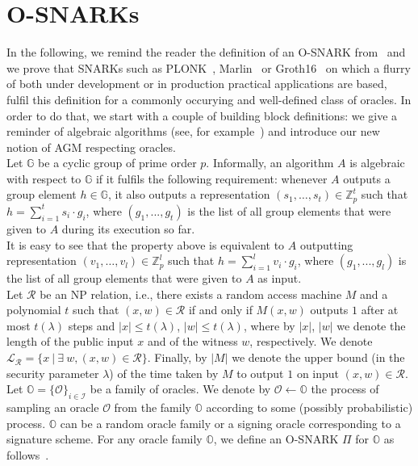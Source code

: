 \section{O-SNARKs}
\label{sec:short_snarks_defs}
In the following, we remind the reader the definition of an O-SNARK from~\cite{O_SNARK} and we prove that 
SNARKs such as PLONK~\cite{plonk}, Marlin~\cite{marlin} or Groth16~\cite{groth16} on which a flurry of 
both under development or in production practical applications are based, fulfil this definition for a commonly occurying 
and well-defined class of oracles. In order to do that, we start with a couple of building block definitions: we give a 
reminder of algebraic algorithms (see, for example~\cite{AGM_model}) and introduce our new notion of AGM respecting oracles. \\

\noindent Let $\mathbb{G}$ be a cyclic group of prime order $p$. Informally, an algorithm $A$ is algebraic with respect to 
$\mathbb{G}$ if it fulfils the following requirement: whenever $A$ outputs a group element $h \in \mathbb{G}$, 
it also outputs a representation $(s_1, \ldots, s_t) \in \mathbb{Z}^{t}_p$ 
such that $h = \sum_ {i =1}^t s_i \cdot g_i$, where $(g_1,...,g_t)$ is the list of all group elements that were given to $A$ during its execution so far. \\

\noindent It is easy to see that the property above is equivalent to $A$ outputting  representation $(v_1, \ldots, v_l) \in \mathbb{Z}^{l}_p$ 
such that $h = \sum_ {i =1}^l v_i \cdot g_i$, where $(g_1,...,g_l)$ is the list of all group elements that were given to $A$ as input. \\

\noindent Let $\mathcal{R}$ be an NP relation, i.e., there exists a random access machine $M$ and a polynomial $t$ 
such that  $(x,w) \in \mathcal{R}$ if and only if $M(x,w)$ outputs $1$ after at most $t(\lambda)$ steps and 
$|x| \leq t(\lambda)$, $|w| \leq t(\lambda)$, where by $|x|$, $|w|$ we denote the length of the public input $x$ 
and of the witness $w$, respectively. We denote $\mathcal{L}_{\mathcal{R}} = \{ x\  | \ \exists \ w,  (x, w) \in \mathcal{R} \}$.  
Finally, by $|M|$ we denote the upper bound (in the security parameter $\lambda$) 
of the time taken by $M$ to output $1$ on input $(x,w) \in \mathcal{R}$.\\

\noindent Let $\mathbb{O} = \{ \mathcal{O} \}_{i \in \mathcal{I}}$ be a family of oracles. We denote by $\mathcal{O} \leftarrow \mathbb{O}$ 
the process of sampling an oracle $\mathcal{O}$ from the family $\mathbb{O}$ according to some (possibly probabilistic) process.
$\mathbb{O}$ can be a random oracle family or a signing oracle corresponding to a signature scheme. For any oracle family 
$\mathbb{O}$, we define an O-SNARK $\Pi$ for $\mathbb{O}$ as follows~\cite{O_SNARK}. \\

